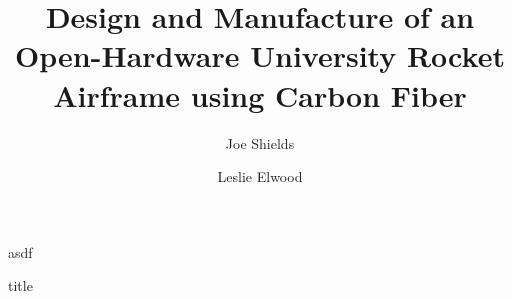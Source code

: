 \documentclass[slidestop, compress]{beamer} %
\title{Design and Manufacture of an Open-Hardware University Rocket Airframe using Carbon Fiber}
\author{Joe Shields \and Leslie Elwood }
\begin{document}
asdf
\begin{frame}
\lipsum
\end{frame}

\begin{block}{title}
	\lipsum
\end{block}
\end{document}
